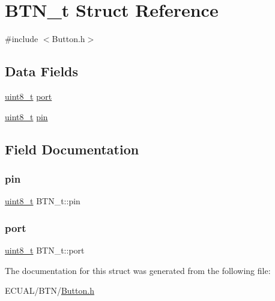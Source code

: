 \hypertarget{struct_b_t_n__t}{}\section{B\+T\+N\+\_\+t Struct Reference}
\label{struct_b_t_n__t}


{\ttfamily \#include $<$Button.\+h$>$}

\subsection*{Data Fields}
\begin{DoxyCompactItemize}
\item 
\hyperlink{_typedef_8h_aba7bc1797add20fe3efdf37ced1182c5}{uint8\+\_\+t} \hyperlink{struct_b_t_n__t_a077af617909b5adc1ad7675464c03c46}{port}
\item 
\hyperlink{_typedef_8h_aba7bc1797add20fe3efdf37ced1182c5}{uint8\+\_\+t} \hyperlink{struct_b_t_n__t_a8afc31678d9341042fbfd9cf65d37134}{pin}
\end{DoxyCompactItemize}


\subsection{Field Documentation}
\mbox{\label{struct_b_t_n__t_a8afc31678d9341042fbfd9cf65d37134}} 
\subsubsection{\texorpdfstring{pin}{pin}}
{\footnotesize\ttfamily \hyperlink{_typedef_8h_aba7bc1797add20fe3efdf37ced1182c5}{uint8\+\_\+t} B\+T\+N\+\_\+t\+::pin}

\mbox{\label{struct_b_t_n__t_a077af617909b5adc1ad7675464c03c46}} 
\subsubsection{\texorpdfstring{port}{port}}
{\footnotesize\ttfamily \hyperlink{_typedef_8h_aba7bc1797add20fe3efdf37ced1182c5}{uint8\+\_\+t} B\+T\+N\+\_\+t\+::port}



The documentation for this struct was generated from the following file\+:\begin{DoxyCompactItemize}
\item 
E\+C\+U\+A\+L/\+B\+T\+N/\hyperlink{_button_8h}{Button.\+h}\end{DoxyCompactItemize}
